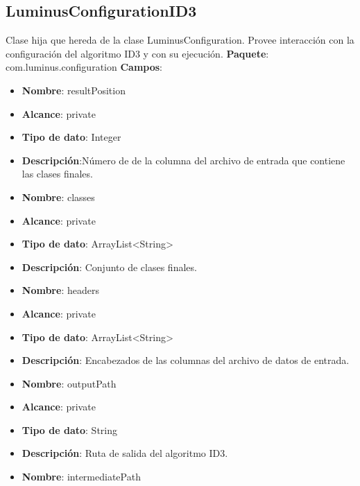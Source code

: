 \subsection{LuminusConfigurationID3}
Clase hija que hereda de la clase LuminusConfiguration. Provee interacción con la configuración del algoritmo ID3 y con su ejecución.
\textbf{Paquete}: com.luminus.configuration
\textbf{Campos}:
\begin{UClist}
	\begin{itemize}
		\item \textbf{Nombre}: resultPosition
		\item \textbf{Alcance}: private
		\item \textbf{Tipo de dato}: Integer
		\item \textbf{Descripción}:Número de  de la columna del archivo de entrada que contiene las clases finales.\\
	\end{itemize}
	\begin{itemize}
		\item \textbf{Nombre}: classes
		\item \textbf{Alcance}: private
		\item \textbf{Tipo de dato}: ArrayList<String>
		\item \textbf{Descripción}: Conjunto de clases finales.\\
	\end{itemize}
	\begin{itemize}
		\item \textbf{Nombre}: headers
		\item \textbf{Alcance}: private
		\item \textbf{Tipo de dato}: ArrayList<String>
		\item \textbf{Descripción}: Encabezados de las columnas del archivo de datos de entrada.\\
	\end{itemize}
	\begin{itemize}
		\item \textbf{Nombre}: outputPath
		\item \textbf{Alcance}: private
		\item \textbf{Tipo de dato}: String
		\item \textbf{Descripción}: Ruta de salida del algoritmo ID3.\\
	\end{itemize}
	\begin{itemize}
		\item \textbf{Nombre}: intermediatePath

\end{itemize}
\end{UClist}
